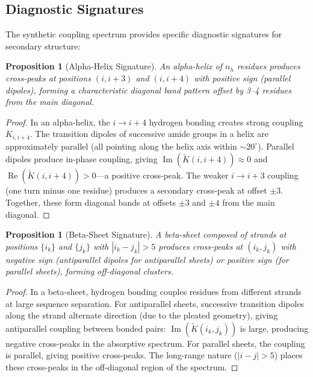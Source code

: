 \documentclass[11pt,twocolumn,a4paper]{article}
\newtheorem{proposition}[theorem]{Proposition}
\theoremstyle{definition}
\theoremstyle{remark}
\newcommand{\Ktilde}{\tilde{K}}
\begin{document}
\subsection{Diagnostic Signatures}

The synthetic coupling spectrum provides specific diagnostic signatures for secondary structure:

\begin{proposition}[Alpha-Helix Signature]
\label{prop:helix_sig}
An alpha-helix of $n_h$ residues produces cross-peaks at positions $(i, i+3)$ and $(i, i+4)$ with positive sign (parallel dipoles), forming a characteristic diagonal band pattern offset by 3--4 residues from the main diagonal.
\end{proposition}

\begin{proof}
In an alpha-helix, the $i \to i+4$ hydrogen bonding creates strong coupling $K_{i,i+4}$. The transition dipoles of successive amide groups in a helix are approximately parallel (all pointing along the helix axis within $\sim 20^\circ$). Parallel dipoles produce in-phase coupling, giving $\operatorname{Im}(\Ktilde(i, i+4)) \approx 0$ and $\operatorname{Re}(\Ktilde(i, i+4)) > 0$---a positive cross-peak. The weaker $i \to i+3$ coupling (one turn minus one residue) produces a secondary cross-peak at offset $\pm 3$. Together, these form diagonal bands at offsets $\pm 3$ and $\pm 4$ from the main diagonal.
\end{proof}

\begin{proposition}[Beta-Sheet Signature]
\label{prop:sheet_sig}
A beta-sheet composed of strands at positions $\{i_k\}$ and $\{j_k\}$ with $|i_k - j_k| > 5$ produces cross-peaks at $(i_k, j_k)$ with negative sign (antiparallel dipoles for antiparallel sheets) or positive sign (for parallel sheets), forming off-diagonal clusters.
\end{proposition}

\begin{proof}
In a beta-sheet, hydrogen bonding couples residues from different strands at large sequence separation. For antiparallel sheets, successive transition dipoles along the strand alternate direction (due to the pleated geometry), giving antiparallel coupling between bonded pairs: $\operatorname{Im}(\Ktilde(i_k, j_k))$ is large, producing negative cross-peaks in the absorptive spectrum. For parallel sheets, the coupling is parallel, giving positive cross-peaks. The long-range nature ($|i - j| > 5$) places these cross-peaks in the off-diagonal region of the spectrum.
\end{proof}
\end{document}
